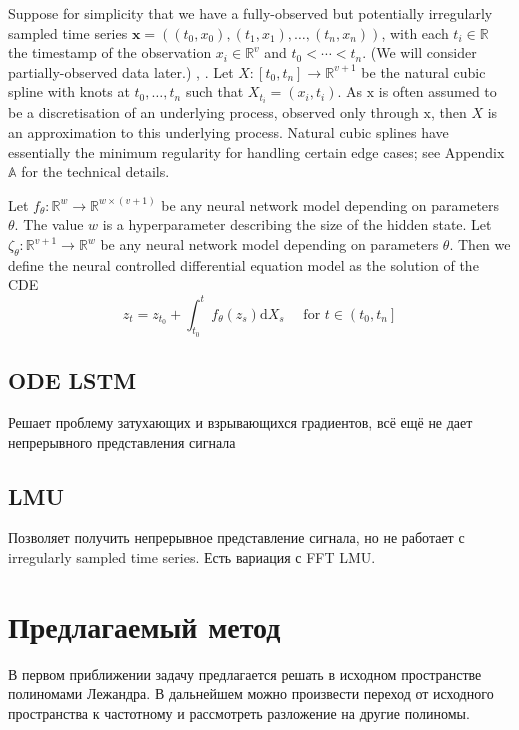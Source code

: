 \documentclass[12pt]{article}
\begin{document}
Suppose for simplicity that we have a fully-observed but potentially irregularly sampled time series $\mathbf{x}=\left(\left(t_{0}, x_{0}\right),\left(t_{1}, x_{1}\right), \ldots,\left(t_{n}, x_{n}\right)\right)$, with each $t_{i} \in \mathbb{R}$ the timestamp of the observation $x_{i} \in \mathbb{R}^{v}$
and $t_{0}<\cdots<t_{n}$. (We will consider partially-observed data later.)
\cite{neural_ode}, \cite{cde}. \cite{dda_ts}
Let $X:\left[t_{0}, t_{n}\right] \rightarrow \mathbb{R}^{v+1}$ be the natural cubic spline with knots at $t_{0}, \ldots, t_{n}$ such that $X_{t_{i}}=\left(x_{i}, t_{i}\right)$. As $\mathrm{x}$ is often assumed to be a discretisation of an underlying process, observed only through $\mathrm{x}$, then $X$ is an approximation to this underlying process. Natural cubic splines have essentially the minimum regularity for handling certain edge cases; see Appendix $\mathbb{A}$ for the technical details.

Let $f_{\theta}: \mathbb{R}^{w} \rightarrow \mathbb{R}^{w \times(v+1)}$ be any neural network model depending on parameters $\theta .$ The value $w$ is a hyperparameter describing the size of the hidden state. Let $\zeta_{\theta}: \mathbb{R}^{v+1} \rightarrow \mathbb{R}^{w}$ be any neural network model depending on parameters $\theta$.
Then we define the neural controlled differential equation model as the solution of the CDE
$$
z_{t}=z_{t_{0}}+\int_{t_{0}}^{t} f_{\theta}\left(z_{s}\right) \mathrm{d} X_{s} \quad \text { for } t \in\left(t_{0}, t_{n}\right]
$$


\subsection{ODE LSTM}
Решает проблему затухающих и взрывающихся градиентов, всё ещё не дает непрерывного представления сигнала

\subsection{LMU}
Позволяет получить непрерывное представление сигнала, но не работает с irregularly sampled time series.
Есть вариация с FFT LMU.
\newpage
\section{Предлагаемый метод}
В первом приближении задачу предлагается решать в исходном пространстве полиномами Лежандра. В дальнейшем можно произвести переход от исходного пространства к частотному и рассмотреть разложение на другие полиномы.
\end{document}
